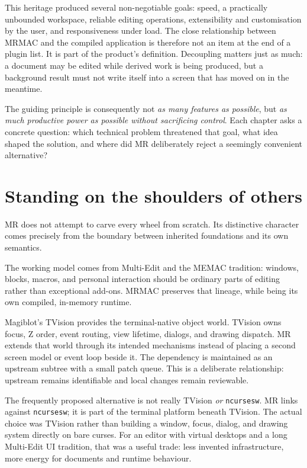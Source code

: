 \documentclass[a4paper,10pt,twoside,openany]{book}
\newcommand{\mr}{\textsc{MR}}
\newcommand{\mrmac}{\textsc{MRMAC}}
\begin{document}
This heritage produced several non-negotiable goals: speed, a practically
unbounded workspace, reliable editing operations, extensibility and
customisation by the user, and responsiveness under load. The close
relationship between \mrmac{} and the compiled application is therefore not
an item at the end of a plugin list. It is part of the product's definition.
Decoupling matters just as much: a document may be edited while derived work
is being produced, but a background result must not write itself into a screen
that has moved on in the meantime.

The guiding principle is consequently not \emph{as many features as possible},
but \emph{as much productive power as possible without sacrificing control}.
Each chapter asks a concrete question: which technical problem threatened that
goal, what idea shaped the solution, and where did \mr{} deliberately reject a
seemingly convenient alternative?

\chapter{Standing on the shoulders of others}

\mr{} does not attempt to carve every wheel from scratch. Its distinctive
character comes precisely from the boundary between inherited foundations and
its own semantics.

The working model comes from Multi-Edit and the MEMAC tradition: windows,
blocks, macros, and personal interaction should be ordinary parts of editing
rather than exceptional add-ons. \mrmac{} preserves that lineage, while being
its own compiled, in-memory runtime.

Magiblot's TVision provides the terminal-native object world. TVision owns
focus, Z order, event routing, view lifetime, dialogs, and drawing dispatch.
\mr{} extends that world through its intended mechanisms instead of placing a
second screen model or event loop beside it. The dependency is maintained as
an upstream subtree with a small patch queue. This is a deliberate
relationship: upstream remains identifiable and local changes remain
reviewable.

The frequently proposed alternative is not really TVision \emph{or}
\texttt{ncursesw}. \mr{} links against \texttt{ncursesw}; it is part of the
terminal platform beneath TVision. The actual choice was TVision rather than
building a window, focus, dialog, and drawing system directly on bare curses.
For an editor with virtual desktops and a long Multi-Edit UI tradition, that
was a useful trade: less invented infrastructure, more energy for documents
and runtime behaviour.
\end{document}
